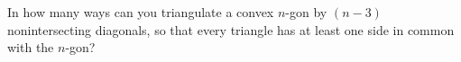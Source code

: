 In how many ways can you triangulate a convex $n$-gon by $(n - 3)$ nonintersecting diagonals, so that every triangle has at least one side in common with the $n$-gon?
